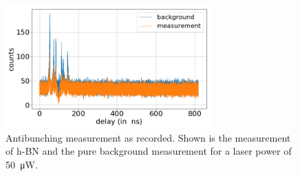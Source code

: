 \begin{figure}[!ht]
    \centering
    \includegraphics[width=0.7\textwidth]{img/output_t2/antibunch_example_50.0muW.png}
    \caption{Antibunching measurement as recorded. Shown is the measurement of h-BN and the pure background measurement for a laser power of \SI{50}{\micro W}.}
    \label{fig_antibunch_raw}
\end{figure}

